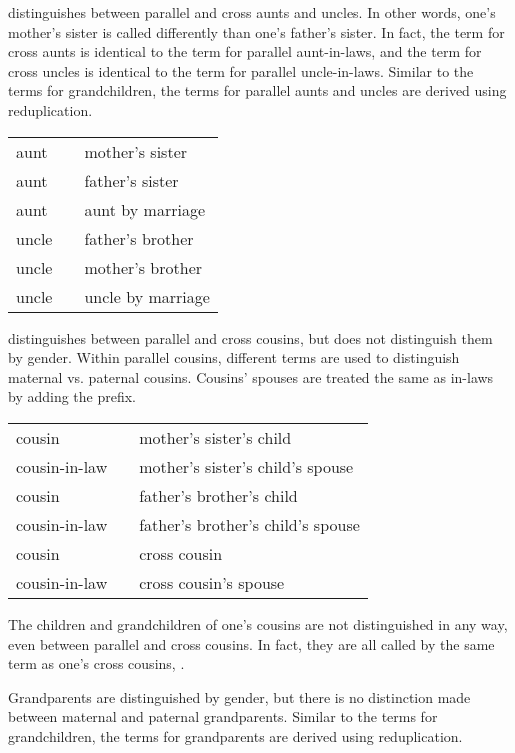 \langtvk{} distinguishes between parallel and cross aunts and uncles. In other words, one's mother's sister is called differently than one's father's sister. In fact, the term for cross aunts is identical to the term for parallel aunt-in-laws, and the term for cross uncles is identical to the term for parallel uncle-in-laws. Similar to the terms for grandchildren, the terms for parallel aunts and uncles are derived using reduplication.

\exdisplay\noexno
\begin{tabu} {l l l}
	aunt &  & mother's sister\\
	aunt &  & father's sister\\
	aunt &  & aunt by marriage\\
	uncle &  & father's brother\\
	uncle &  & mother's brother\\
	uncle &  & uncle by marriage\\
\end{tabu}
\xe

\langtvk{} distinguishes between parallel and cross cousins, but does not distinguish them by gender. Within parallel cousins, different terms are used to distinguish maternal vs. paternal cousins. Cousins' spouses are treated the same as in-laws by adding the  prefix.

\exdisplay\noexno
\begin{tabu} {l l l}
	cousin &  & mother's sister's child\\
	cousin-in-law &  & mother's sister's child's spouse\\
	cousin &  & father's brother's child\\
	cousin-in-law &  & father's brother's child's spouse\\
	cousin &  & cross cousin\\
	cousin-in-law &  & cross cousin's spouse\\
\end{tabu}
\xe

The children and grandchildren of one's cousins are not distinguished in any way, even between parallel and cross cousins. In fact, they are all called by the same term as one's cross cousins, .

Grandparents are distinguished by gender, but there is no distinction made between maternal and paternal grandparents. Similar to the terms for grandchildren, the terms for grandparents are derived using reduplication.

